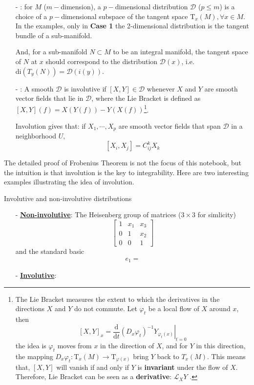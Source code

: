 \begin{enumerate}
    \item[-] \underline{}: for $M$ ($m-$dimension), a $p-$dimensional distribution $\mathcal{D}$ ($p\leq m$) is a choice of a $p-$dimensional subspace of the tangent space $\mathrm{T}_x(M),\forall x\in M$. In the examples, only in \textbf{Case 1} the 2-dimensional distribution is the tangent bundle of a sub-manifold.
    
    And, for a sub-manifold $N\subset M$ to be an integral manifold, the tangent space of $N$ at $x$ should correspond to the distribution $\mathcal{D}(x)$, i.e. $\mathrm{di}(T_y(N))=\mathcal{D}(i(y))$.
    
    \item[-] \underline{}: A smooth $\mathcal{D}$ is involutive if $[X,Y]\in \mathcal{D}$ whenever $X$ and $Y$ are smooth vector fields that lie in $\mathcal{D}$, where the Lie Bracket is defined as $[X,Y](f)=X(Y(f))-Y(X(f))$\footnote{The Lie Bracket measures the extent to which the derivatives in the directions $X$ and $Y$ do not commute. Let $\varphi_t$ be a local flow of $X$ around $x$, then 
    $$
    [X,Y]_x = \frac{\mathrm{d}}{\mathrm{d}t}\left. \left(D_x\varphi_t\right)^{-1} Y_{\varphi_t(x)} \right\vert_{t=0}
    $$
    the idea is $\varphi_t$ moves from $x$ in the direction of $X$, and for $Y$ in this direction, the mapping $D_x\varphi_t: \mathrm{T}_{x}(M)\rightarrow \mathrm{T}_{\varphi(x)}$ bring $Y$ back to $T_{x}(M)$. This means that, $[X,Y]$ will vanish if and only if $Y$ is \textbf{invariant} under the flow of $X$. Therefore, Lie Bracket can be seen as a \textbf{derivative}: $\mathcal{L}_XY$
    .}. 
    
    Involution gives that: if $X_1,\cdots,X_p$ are smooth vector fields that span $\mathcal{D}$ in a neighborhood $U$,
    $$
    [X_i,X_j] = C_{ij}^kX_k
    $$
\end{enumerate}

The detailed proof of Frobenius Theorem is not the focus of this notebook, but the intuition is that involution is the key to integrability. Here are two interesting examples illustrating the idea of involution.
\begin{example}{Involutive and non-involutive distributions}
    \begin{enumerate}
        \item[-] \underline{\textbf{Non-involutive}}: The Heisenberg group of matrices ($3\times 3$ for simlicity) $$ \begin{bmatrix}
            1 & x_1 & x_3 \\
            0 & 1 & x_2 \\
            0 & 0 & 1
        \end{bmatrix} $$
        and the standard basic
        \begin{align*}
            e_1 =
        \end{align*}
        \item[-] \underline{\textbf{Involutive}}:
    \end{enumerate}
\end{example}